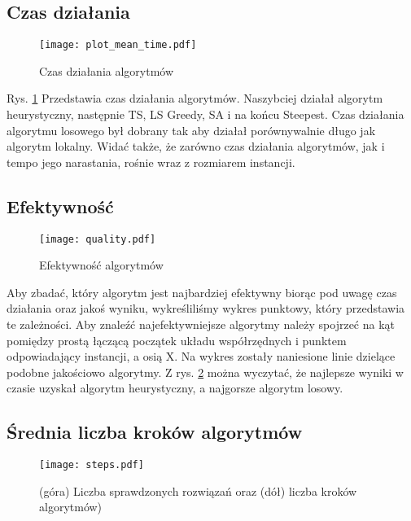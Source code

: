 \documentclass{article}
\begin{document}
\subsection{Czas działania}

\begin{figure}[H]
\begin{center}
    \texttt{[image: plot\_mean\_time.pdf]}
\end{center}
\caption{Czas działania algorytmów}
\label{fig:plot_time}
\end{figure}

Rys. \ref{fig:plot_time} Przedstawia czas działania algorytmów. Naszybciej działał algorytm heurystyczny, następnie TS, LS Greedy, SA i na końcu Steepest. Czas działania algorytmu losowego był dobrany tak aby działał porównywalnie długo jak algorytm lokalny. Widać także, że zarówno czas działania algorytmów, jak i tempo jego narastania, rośnie wraz z rozmiarem instancji.


\subsection{Efektywność}


\begin{figure}[H]
\begin{center}
\texttt{[image: quality.pdf]}
\end{center}
\caption{Efektywność algorytmów}
\label{fig:plot_quality}
\end{figure}

Aby zbadać, który algorytm jest najbardziej efektywny biorąc pod uwagę czas działania oraz jakoś wyniku, wykreśliliśmy wykres punktowy, który przedstawia te zależności. Aby znaleźć najefektywniejsze algorytmy należy spojrzeć na kąt pomiędzy prostą łączącą początek układu współrzędnych i punktem odpowiadający instancji, a osią X. Na wykres zostały naniesione linie dzielące podobne jakościowo algorytmy. Z rys. \ref{fig:plot_quality} można wyczytać, że najlepsze wyniki w czasie uzyskał algorytm heurystyczny, a najgorsze algorytm losowy.


\subsection{Średnia liczba kroków algorytmów}

\begin{figure} 
\begin{center}
    \texttt{[image: steps.pdf]}
\end{center}
\caption{(góra) Liczba sprawdzonych rozwiązań oraz (dół) liczba kroków algorytmów)}
\label{fig:plot_steps}
\end{figure}
\end{document}
